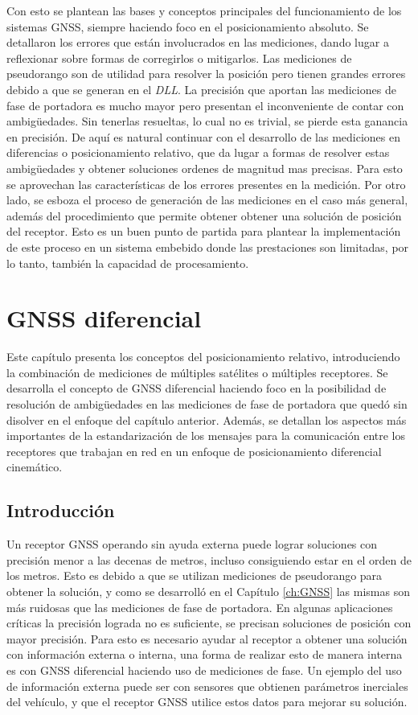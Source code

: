 \documentclass[a4paper,12pt,oneside,onecolumn,final,openright]{book}%
\begin{document}
	Con esto se plantean las bases y conceptos principales del funcionamiento de los sistemas GNSS, siempre haciendo foco en el posicionamiento absoluto. Se detallaron los errores que están involucrados en las mediciones, dando lugar a reflexionar sobre formas de corregirlos o mitigarlos. Las mediciones de pseudorango son de utilidad para resolver la posición pero tienen grandes errores debido a que se generan en el \textit{DLL}. La precisión que aportan las mediciones de fase de portadora es mucho mayor pero presentan el inconveniente de contar con ambigüedades. Sin tenerlas resueltas, lo cual no es trivial, se pierde esta ganancia en precisión. De aquí es natural continuar con el desarrollo de las mediciones en diferencias o posicionamiento relativo, que da lugar a formas de resolver estas ambigüedades y obtener soluciones ordenes de magnitud mas precisas. Para esto se aprovechan las características de los errores presentes en la medición. Por otro lado, se esboza el proceso de generación de las mediciones en el caso más general, además del procedimiento que permite obtener obtener una solución de posición del receptor. Esto es un buen punto de partida para plantear la implementación de este proceso en un sistema embebido donde las prestaciones son limitadas, por lo tanto, también la capacidad de procesamiento.

\chapter{GNSS diferencial}\label{ch:DGNSS}
	Este capítulo presenta los conceptos del posicionamiento relativo, introduciendo la combinación de mediciones de múltiples satélites o múltiples receptores. Se desarrolla el concepto de GNSS diferencial haciendo foco en la posibilidad de resolución de ambigüedades en las mediciones de fase de portadora que quedó sin disolver en el enfoque del capítulo anterior. Además, se detallan los aspectos más importantes de la estandarización de los mensajes para la comunicación entre los receptores que trabajan en red en un enfoque de posicionamiento diferencial cinemático.
\section{Introducción}
	Un receptor GNSS operando sin ayuda externa puede lograr soluciones con precisión menor a las decenas de metros, incluso consiguiendo estar en el orden de los metros. Esto es debido a que se utilizan mediciones de pseudorango para obtener la solución, y como se desarrolló en el Capítulo \ref{ch:GNSS} las mismas son más ruidosas que las mediciones de fase de portadora. En algunas aplicaciones críticas la precisión lograda no es suficiente, se precisan soluciones de posición con mayor precisión.  Para esto es necesario ayudar al receptor a obtener una solución con información externa o interna, una forma de realizar esto de manera interna es con GNSS diferencial haciendo uso de mediciones de fase. Un ejemplo del uso de información externa puede ser con sensores que obtienen parámetros inerciales del vehículo, y que el receptor GNSS utilice estos datos para mejorar su solución.
	
\end{document}
